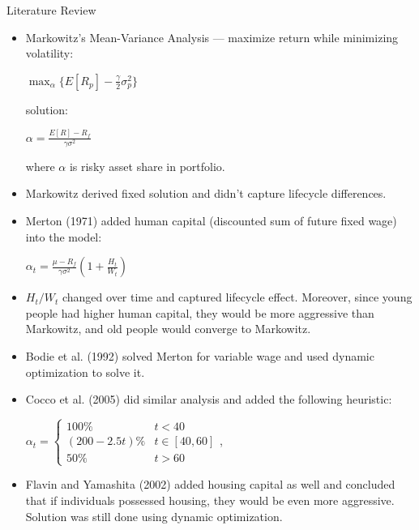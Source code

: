 \documentclass{beamer}
\begin{document}
\begin{frame}[allowframebreaks]{Literature Review}
  \begin{itemize}
	\item Markowitz's Mean-Variance Analysis --- maximize return while minimizing volatility:
\begin{center}
  $\displaystyle\max_{\alpha} \{ E[R_p] - \frac{\gamma}{2}\sigma^2_p \}$
\end{center}
solution:
\begin{center}
	$\alpha = \frac{E[R] - R_f}{\gamma\sigma^2}$
\end{center}
where $\alpha$ is risky asset share in portfolio.

	\item Markowitz derived fixed solution and didn't capture lifecycle differences.

\framebreak

	\item Merton (1971) added human capital (discounted sum of future fixed wage) into the model:
  
\begin{center}
	$\alpha_t = \frac{\mu - R_f}{\gamma \sigma^2}\left(1+\frac{H_t}{W_t}\right)$
\end{center}

	\item $H_t/W_t$ changed over time and captured lifecycle effect. Moreover, since young people had higher human capital, they would be more aggressive than Markowitz, and old people would converge to Markowitz.

	\item Bodie et al. (1992) solved Merton for variable wage and used dynamic optimization to solve it. 
\framebreak
	
	\item Cocco et al. (2005) did similar analysis and added the following heuristic:


\begin{center}
	$\alpha_t = \begin{cases} 100\% & t<40\\(200-2.5t)\% & t\in[40,60]\\50\% & t>60 \end{cases}$,
\end{center}

	\item Flavin and Yamashita (2002) added housing capital as well and concluded that if individuals possessed housing, they would be even more aggressive. Solution was still done using dynamic optimization.


\end{itemize}
\end{frame}
\end{document}
